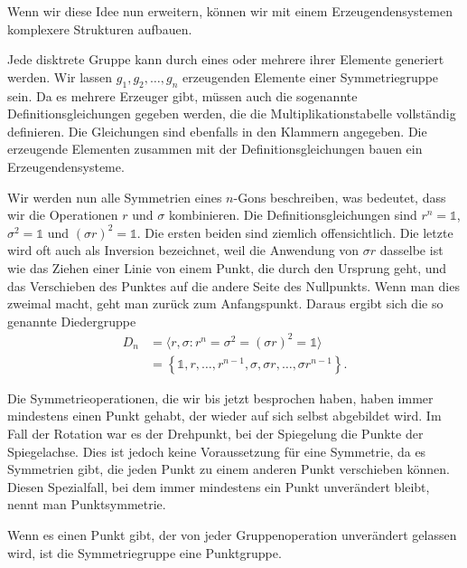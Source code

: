 Wenn wir diese Idee nun erweitern, können wir mit einem Erzeugendensystemen
komplexere Strukturen aufbauen.

\begin{definition}[Erzeugendensysteme]
	Jede disktrete Gruppe kann durch eines oder mehrere ihrer Elemente generiert
	werden.  Wir lassen \(g_1, g_2, \ldots, g_n\) erzeugenden Elemente einer
	Symmetriegruppe sein.  Da es mehrere Erzeuger gibt, müssen auch die
	sogenannte Definitionsgleichungen gegeben werden, die die
	Multiplikationstabelle vollständig definieren. Die Gleichungen sind ebenfalls
	in den Klammern angegeben. Die erzeugende Elementen zusammen mit der
	Definitionsgleichungen bauen ein Erzeugendensysteme.
\end{definition}
\begin{beispiel}
	Wir werden nun alle Symmetrien eines \(n\)-Gons beschreiben, was bedeutet,
	dass wir die Operationen \(r\) und \(\sigma\) kombinieren. Die
	Definitionsgleichungen sind \(r^n = \mathds{1}\), \(\sigma^2 =
	\mathds{1}\) und \((\sigma r)^2 = \mathds{1}\).
	Die ersten beiden sind ziemlich offensichtlich. Die letzte wird oft auch als
	Inversion bezeichnet, weil die Anwendung von \(\sigma r\) dasselbe ist wie
	das Ziehen einer Linie von einem Punkt, die durch den Ursprung geht, und das
	Verschieben des Punktes auf die andere Seite des Nullpunkts. Wenn man dies
	zweimal macht, geht man zurück zum Anfangspunkt.
	Daraus ergibt sich die so genannte Diedergruppe 
	\begin{align*}
		D_n &= \langle r, \sigma : r^n = \sigma^2 = (\sigma r)^2 = \mathds{1} \rangle \\
			&= \left\{
					\mathds{1}, r, \ldots, r^{n-1}, \sigma, \sigma r, \ldots, \sigma r^{n-1}
			\right\}.
	\end{align*}
\end{beispiel}

Die Symmetrieoperationen, die wir bis jetzt besprochen haben, haben immer
mindestens einen Punkt gehabt, der wieder auf sich selbst abgebildet wird. Im
Fall der Rotation war es der Drehpunkt, bei der Spiegelung die Punkte der
Spiegelachse. Dies ist jedoch keine Voraussetzung für eine Symmetrie, da es
Symmetrien gibt, die jeden Punkt zu einem anderen Punkt verschieben können.
Diesen Spezialfall, bei dem immer mindestens ein Punkt unverändert bleibt, nennt man
Punktsymmetrie.
\begin{definition}[Punktgruppe]
	Wenn es einen Punkt gibt, der von jeder Gruppenoperation unverändert gelassen
	wird, ist die Symmetriegruppe eine Punktgruppe.
\end{definition}

